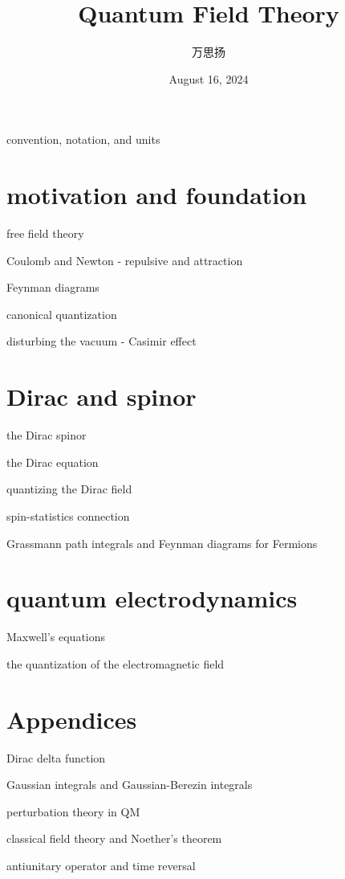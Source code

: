 \documentclass[10pt, a4paper]{report}
\title{\Huge \textbf{Quantum Field Theory}}
\author{万思扬}
\date{August 16, 2024}
\renewcommand{\chaptermark}[1]{%
	\markboth{Chapter \thechapter\ #1}{}%
}
\numberwithin{equation}{section}
\begin{document}
	\maketitle
	
	\tableofcontents
	
	\pagebreak
	
	{convention, notation, and units}
	
	\part{motivation and foundation}
	
	{free field theory}
	
	{Coulomb and Newton - repulsive and attraction}
	
	{Feynman diagrams}
	
	{canonical quantization}
	
	{disturbing the vacuum - Casimir effect}
	
	\part{Dirac and spinor} \label{part II}
	
	{the Dirac spinor}
	
	{the Dirac equation}
	
	{quantizing the Dirac field}
	
	{spin-statistics connection}
	
	{Grassmann path integrals and Feynman diagrams for Fermions}
	
	\part{quantum electrodynamics}
	
	{Maxwell's equations}
	
	{the quantization of the electromagnetic field}
	
	\appendix
	
	\part*{Appendices}
	\renewcommand{\chaptermark}[1]{%
		\markboth{Appendix \thechapter\ #1}{}%
	}
	
	{Dirac delta function}
	
	{Gaussian integrals and Gaussian-Berezin integrals}
	
	{perturbation theory in QM}
	
	{classical field theory and Noether's theorem}
	
	{antiunitary operator and time reversal}
\end{document}
